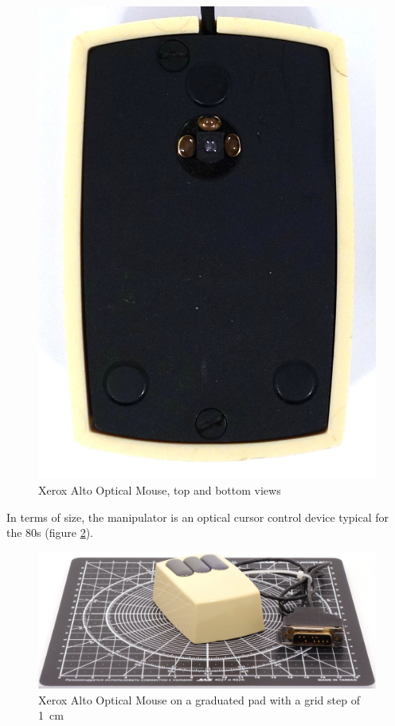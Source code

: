 \documentclass[11pt, a4paper]{article}
\begin{document}
\begin{figure}[h]
    \includegraphics[scale=0.5]{1981_xerox_alto_mouse/bottom_30.jpg}
    \caption{Xerox Alto Optical Mouse, top and bottom views}
    \label{NecAltoTopAndBottom}
\end{figure}

In terms of size, the manipulator is an optical cursor control device typical for the 80s (figure \ref{fig:NecAltoSize}).

\begin{figure}[h]
    \centering
    \includegraphics[scale=0.4]{1981_xerox_alto_mouse/size_15.jpg}
    \caption{Xerox Alto Optical Mouse on a graduated pad with a grid step of 1~cm}
    \label{fig:NecAltoSize}
\end{figure}
\end{document}
